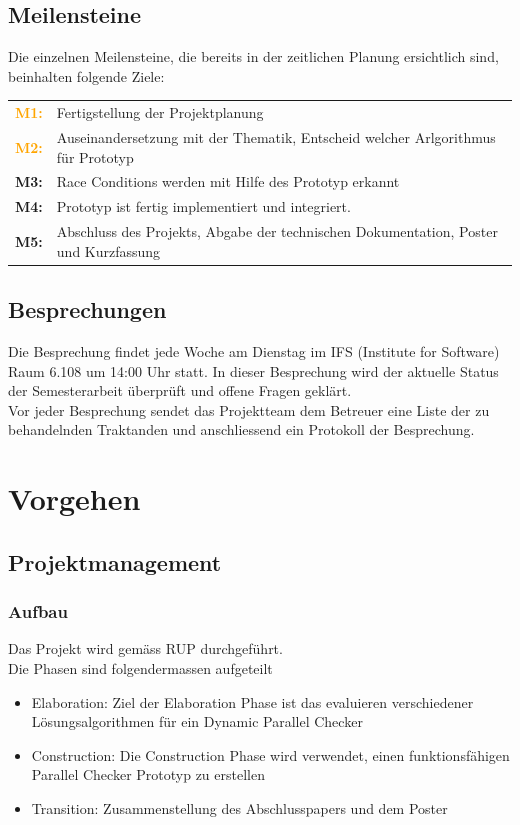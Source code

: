 \documentclass[10pt,a4paper]{article}
\begin{document}
\subsection{Meilensteine}
\begin{flushleft}
	Die einzelnen Meilensteine, die bereits in der zeitlichen Planung ersichtlich sind, beinhalten folgende Ziele:
\end{flushleft}
\begin{tabular}{cl}
	\textcolor{Orange}{\textbf{M1:}} & Fertigstellung der Projektplanung\\[0.2cm]
	\textcolor{Orange}{\textbf{M2:}} & Auseinandersetzung mit der Thematik, Entscheid welcher Arlgorithmus für Prototyp\\[0.2cm]
	\textcolor{NavyBlue}{\textbf{M3:}} & Race Conditions werden mit Hilfe des Prototyp erkannt\\[0.2cm]
	\textcolor{NavyBlue}{\textbf{M4:}} & Prototyp ist fertig implementiert und integriert.\\[0.2cm]
	\textcolor{Dandelion}{\textbf{M5:}} & Abschluss des Projekts, Abgabe der technischen Dokumentation, Poster und Kurzfassung\\
\end{tabular}
\subsection{Besprechungen}
\begin{flushleft}
	Die Besprechung findet jede Woche am Dienstag im IFS (Institute for Software) Raum 6.108 um 14:00 Uhr statt. In dieser Besprechung wird der aktuelle Status der Semesterarbeit überprüft und offene Fragen geklärt.\\
	Vor jeder Besprechung sendet das Projektteam dem Betreuer eine Liste der zu behandelnden Traktanden und anschliessend ein Protokoll der Besprechung.
\end{flushleft}
\newpage
\section{Vorgehen}
\subsection{Projektmanagement}
\subsubsection{Aufbau}
Das Projekt wird gemäss RUP durchgeführt.\\
Die Phasen sind folgendermassen aufgeteilt\\
\begin{itemize}
	\item Elaboration: Ziel der Elaboration Phase ist das evaluieren verschiedener Lösungsalgorithmen für ein Dynamic Parallel Checker
	\item Construction: Die Construction Phase wird verwendet, einen funktionsfähigen Parallel Checker Prototyp zu erstellen
	\item Transition: Zusammenstellung des Abschlusspapers und dem Poster
\end{itemize}
\end{document}
